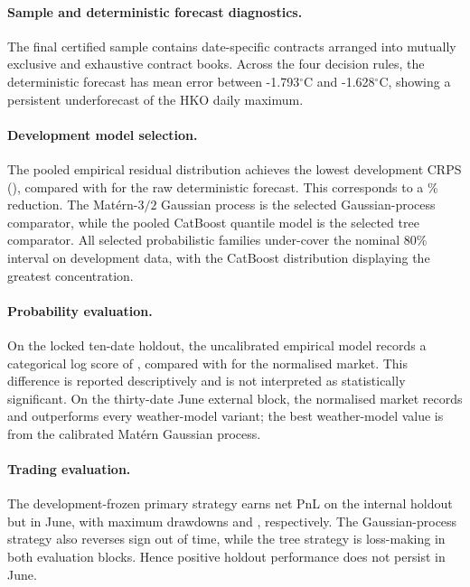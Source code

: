 \paragraph{Sample and deterministic forecast diagnostics.}
The final certified sample contains \NCertifiedContracts{} date-specific contracts arranged into \NSettlementDates{} mutually exclusive and exhaustive contract books. Across the four decision rules, the deterministic forecast has mean error between -1.793$^\circ$C and -1.628$^\circ$C, showing a persistent underforecast of the HKO daily maximum.

\paragraph{Development model selection.}
The pooled empirical residual distribution achieves the lowest development CRPS (\DevelopmentEmpiricalCRPS{}), compared with \DevelopmentRawCRPS{} for the raw deterministic forecast. This corresponds to a \DevelopmentEmpiricalCRPSReduction\% reduction. The Mat\'{e}rn-$3/2$ Gaussian process is the selected Gaussian-process comparator, while the pooled CatBoost quantile model is the selected tree comparator. All selected probabilistic families under-cover the nominal 80\% interval on development data, with the CatBoost distribution displaying the greatest concentration.

\paragraph{Probability evaluation.}
On the locked ten-date holdout, the uncalibrated empirical model records a categorical log score of \HoldoutEmpiricalLogScore{}, compared with \HoldoutMarketLogScore{} for the normalised market. This difference is reported descriptively and is not interpreted as statistically significant. On the thirty-date June external block, the normalised market records \ExternalMarketLogScore{} and outperforms every weather-model variant; the best weather-model value is \ExternalBestModelLogScore{} from the calibrated Mat\'{e}rn Gaussian process.

\paragraph{Trading evaluation.}
The development-frozen primary strategy earns net PnL \PrimaryHoldoutPnL{} on the internal holdout but \PrimaryExternalPnL{} in June, with maximum drawdowns \PrimaryHoldoutDrawdown{} and \PrimaryExternalDrawdown{}, respectively. The Gaussian-process strategy also reverses sign out of time, while the tree strategy is loss-making in both evaluation blocks. Hence positive holdout performance does not persist in June.

